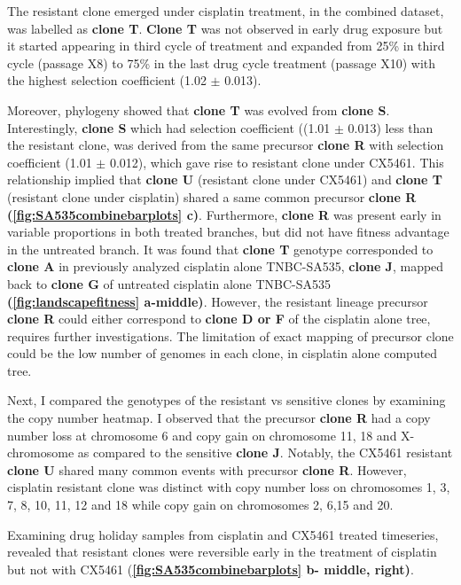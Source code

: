 
The resistant clone emerged under cisplatin treatment, in the combined dataset, was labelled as \textbf{clone T}. \textbf{Clone T} was not observed in early drug exposure but it started appearing in third cycle of treatment and expanded from 25\% in third cycle (passage X8) to 75\% in the last drug cycle treatment (passage X10) with the highest selection coefficient (1.02 $\pm$ 0.013). 

Moreover, phylogeny showed that \textbf{clone T} was evolved from \textbf{clone S}. Interestingly, \textbf{clone S} which had selection coefficient ((1.01 $\pm$ 0.013) less than the resistant clone, was derived from the same precursor \textbf{clone R} with selection coefficient (1.01 $\pm$ 0.012), which gave rise to resistant clone under CX5461. This relationship implied that \textbf{clone U} (resistant clone under CX5461) and \textbf{clone T} (resistant clone under cisplatin) shared a same common precursor \textbf{clone R} \textbf{(\autoref{fig:SA535combinebarplots} c)}. 
Furthermore, \textbf{clone R} was present early in variable proportions in both treated branches, but did not have fitness advantage in the untreated branch. It was found that \textbf{clone T} genotype corresponded to \textbf{clone A} in previously analyzed cisplatin alone TNBC-SA535, \textbf{clone J}, mapped back to \textbf{clone G} of untreated cisplatin alone TNBC-SA535 \textbf{(\autoref{fig:landscapefitness} a-middle)}. However, the resistant lineage precursor \textbf{clone R} could either correspond to \textbf{clone D or F} of the cisplatin alone tree, requires further investigations. The limitation of exact mapping of precursor clone could be the low number of genomes in each clone, in cisplatin alone computed tree.


Next, I compared the genotypes of the resistant vs sensitive clones by examining the copy number heatmap. I observed that the precursor \textbf{clone R} had a copy number loss at chromosome 6 and copy gain on chromosome 11, 18 and X-chromosome as compared to the sensitive \textbf{clone J}. Notably, the CX5461 resistant \textbf{clone U} shared many common events with precursor \textbf{clone R}. However, cisplatin resistant clone was distinct with copy number loss on chromosomes 1, 3, 7, 8, 10, 11, 12 and 18 while copy gain on chromosomes 2, 6,15 and 20.


Examining drug holiday samples from cisplatin and CX5461 treated timeseries, revealed that resistant clones were reversible early in the treatment of cisplatin but not with CX5461 (\textbf{\autoref{fig:SA535combinebarplots} b- middle, right)}.


